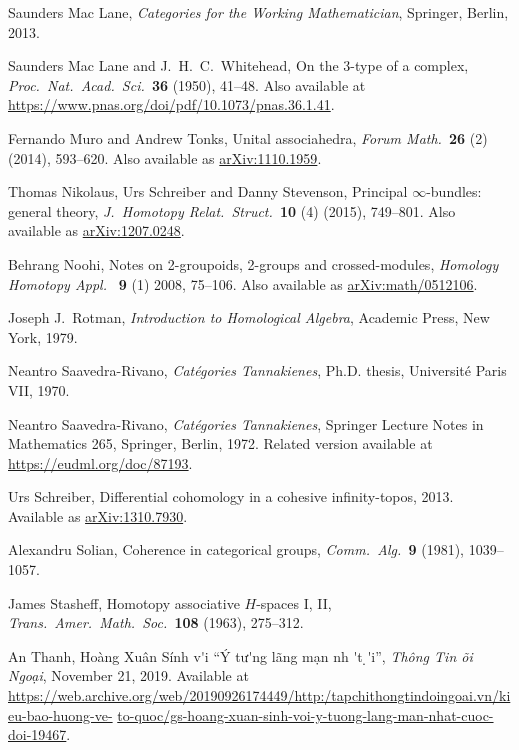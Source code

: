 \documentclass[reqno]{amsart}
\theoremstyle{definition}
\begin{document}
\begin{thebibliography}{99}
Saunders Mac Lane, \textsl{Categories for the Working Mathematician}, 
Springer, Berlin, 2013.

Saunders Mac Lane and J.\ H.\ C.\ Whitehead, On the
3-type of a complex, \textsl{Proc.\ Nat.\ Acad.\ Sci.\ }\textbf{36} (1950),
41--48.  Also available at \href{https://www.pnas.org/doi/pdf/10.1073/pnas.36.1.41}{https://www.pnas.org/doi/pdf/10.1073/pnas.36.1.41}.

Fernando Muro and Andrew Tonks, Unital associahedra, 
\textsl{Forum Math.\ }\textbf{26} (2) (2014), 593--620.  Also available
as \href{https://arxiv.org/abs/1110.1959}{arXiv:1110.1959}.

Thomas Nikolaus, Urs Schreiber and Danny Stevenson,
Principal $\infty$-bundles: general theory, \textsl{J.\ Homotopy Relat.\ Struct.\ }\textbf{10} (4) (2015), 749--801.  Also available as \href{https://arxiv.org/abs/1207.0248}{arXiv:1207.0248}.

Behrang Noohi, Notes on 2-groupoids, 2-groups and crossed-modules, 
\textsl{Homology Homotopy Appl.\ } \textbf{9} (1) 2008, 75--106.
Also available as \href{https://arxiv.org/abs/math/0512106}{ arXiv:math/0512106}.

Joseph J.\ Rotman, \textsl{Introduction to Homological Algebra},
Academic Press, New York, 1979.

Neantro Saavedra-Rivano, \textsl{Cat\'egories Tannakienes}, Ph.D. thesis, Universit\'e Paris VII, 1970.

Neantro Saavedra-Rivano, \textsl{Cat\'egories Tannakienes}, Springer Lecture Notes in Mathematics 265, Springer, Berlin, 1972.  Related version available at
\href{https://eudml.org/doc/87193}{https://eudml.org/doc/87193}.

Urs Schreiber, Differential cohomology in a cohesive infinity-topos, 2013.  Available as \href{https://arxiv.org/abs/1310.7930}{arXiv:1310.7930}.

Alexandru Solian, Coherence in categorical groups, \textsl{Comm.\ Alg.\ }\textbf{9} (1981), 1039--1057.

James Stasheff, Homotopy associative $H$-spaces I, II,
\textsl{Trans.\ Amer.\ Math.\ Soc.\ }\textbf{108} (1963), 275--312.

An Thanh, Ho\`ang Xu\^an S\'inh v{\selectfont \'\ohorn}i
``\'Y tư{\selectfont \'\ohorn}ng l\~ang m\d an nh{  \selectfont  \'\acircumflex t \d\ocircumflex \dj \'\ohorn}i'', 
\textsl{Th\^ong Tin \DJ\~{o}i Ngo\d ai}, November 21, 2019.  Available at
\href{https://web.archive.org/web/20190926174449/http:/tapchithongtindoingoai.vn/kieu-bao-huong-ve-to-quoc/gs-hoang-xuan-sinh-voi-y-tuong-lang-man-nhat-cuoc-doi-19467}{https://web.archive.org/web/20190926174449/http:/tapchithongtindoingoai.vn/kieu-bao-huong-ve-} \hfill \break \href{https://web.archive.org/web/20190926174449/http:/tapchithongtindoingoai.vn/kieu-bao-huong-ve-to-quoc/gs-hoang-xuan-sinh-voi-y-tuong-lang-man-nhat-cuoc-doi-19467}{to-quoc/gs-hoang-xuan-sinh-voi-y-tuong-lang-man-nhat-cuoc-doi-19467}.


\end{thebibliography}
\end{document}
